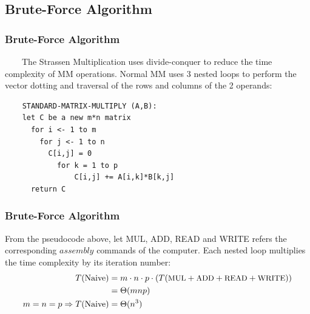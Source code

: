 \documentclass[cjk]{beamer}
\begin{document}
\subsection{Brute-Force Algorithm}
\begin{frame}[fragile]
  \frametitle{\textbf{Brute-Force Algorithm}}
  ~~~~The Strassen Multiplication uses divide-conquer to reduce the time complexity of MM operations.
  Normal MM uses 3 nested loops to perform the vector dotting and traversal of the rows and columns of the 2 operands:
  \begin{lstlisting}
    STANDARD-MATRIX-MULTIPLY (A,B):
    let C be a new m*n matrix
      for i <- 1 to m
        for j <- 1 to n
          C[i,j] = 0
            for k = 1 to p
                C[i,j] += A[i,k]*B[k,j]
      return C
  \end{lstlisting}
\end{frame}
\begin{frame}
  \frametitle{\textbf{Brute-Force Algorithm}}

  From the pseudocode above, let MUL, ADD, READ and WRITE refers the corresponding \(assembly\) commands of the computer.
  Each nested loop multiplies the time complexity by its iteration number:
  \begin{equation}
    \begin{aligned}
      T(\text{Naive})                  & =m\cdot n\cdot p\cdot (T(\text{\small MUL}+\text{\small ADD}+\text{\small READ}+\text{\small WRITE})) \\
                                       & =\Theta(mnp)                                                                                          \\
      m=n=p\Rightarrow T(\text{Naive}) & =\Theta(n^{3})
    \end{aligned}
  \end{equation}

\end{frame}
\end{document}
